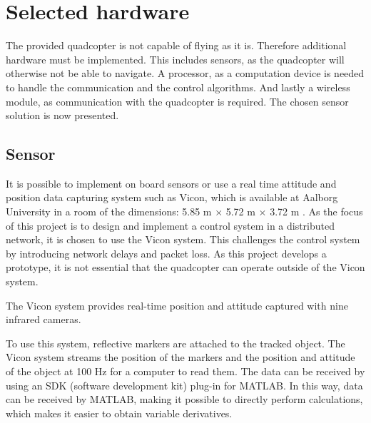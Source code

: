\section{Selected hardware}
The provided quadcopter is not capable of flying as it is. Therefore additional hardware must be implemented. This includes sensors, as the quadcopter will otherwise not be able to navigate. A processor, as a computation device is needed to handle the communication and the control algorithms. And lastly a wireless module, as communication with the quadcopter is required. The chosen sensor solution is now presented.

\subsection{Sensor}
It is possible to implement on board sensors or use a real time attitude and position data capturing system such as Vicon, which is available at Aalborg University in a room of the dimensions: 5.85 m $\times$ 5.72 m $\times$ 3.72 m .
As the focus of this project is to design and implement a control system in a distributed network, it is chosen to use the Vicon system. This challenges the control system by introducing network delays and packet loss. As this project develops a prototype, it is not essential that the quadcopter can operate outside of the Vicon system.

The Vicon system provides real-time position and attitude captured with nine infrared cameras.
%

To use this system, reflective markers are attached to the tracked object. The Vicon system streams the position of the markers and the position and attitude of the object at 100 Hz for a computer to read them\cite{ViconDataSTream}. The data can be received by using an SDK (software development kit) plug-in for MATLAB. In this way, data can be received by MATLAB, making it possible to directly perform calculations, which makes it easier to obtain variable derivatives.

